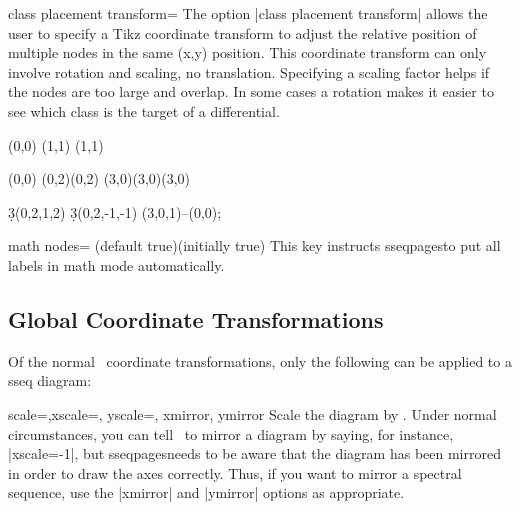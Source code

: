 \documentclass{ltxdoc}
\def\sseqpages{sseqpages}
\begin{document}
\begin{sseqdata}[name=ex1,degree={#1}{1-#1}]
\begin{key}{class placement transform=}
The option |class placement transform| allows the user to specify a Tikz coordinate transform to adjust the relative position of multiple nodes in the same (x,y) position. This coordinate transform can only involve rotation and scaling, no translation. Specifying a scaling factor helps if the nodes are too large and overlap. In some cases a rotation makes it easier to see which class is the target of a differential.
\begin{codeexample}[width=5cm]
\begin{sseqpage}[classes={draw=none},class placement transform={xscale=3},
                 math nodes, xscale=2, x axis extend end=0.7cm]
\class["\mathbb{Z}"](0,0)
\class["\mathbb{Z}/2"](1,1)
\class["\mathbb{Z}/3"](1,1)
\end{sseqpage}
\end{codeexample}
\begin{codeexample}[width=5cm]
\begin{sseqpage}[classes=fill,class placement transform={rotate=40},
                 cohomological Serre grading,differentials=blue,scale=0.7]
\class(0,0)
\class(0,2)\class(0,2)
\class[red](3,0)\class[green](3,0)\class[blue](3,0)

\d3(0,2,1,2)
\d3(0,2,-1,-1)
\draw[->,red](3,0,1)--(0,0);
\end{sseqpage}
\end{codeexample}
\end{key}

\begin{key}{math nodes= (default true)(initially true)}
This key instructs \sseqpages\space to put all labels in math mode automatically.
\end{key}



\subsection{Global Coordinate Transformations}
Of the normal \tikzname\ coordinate transformations, only the following can be applied to a sseq diagram:
\begin{keylist}{scale=,xscale=, yscale=, xmirror, ymirror}
Scale the diagram by . Under normal circumstances, you can tell \tikzname\ to mirror a diagram by saying, for instance, |xscale=-1|, but \sseqpages\space needs to be aware that the diagram has been mirrored in order to draw the axes correctly. Thus, if you want to mirror a spectral sequence, use the |xmirror| and |ymirror| options as appropriate.
\end{keylist}


\end{sseqdata}
\end{document}
